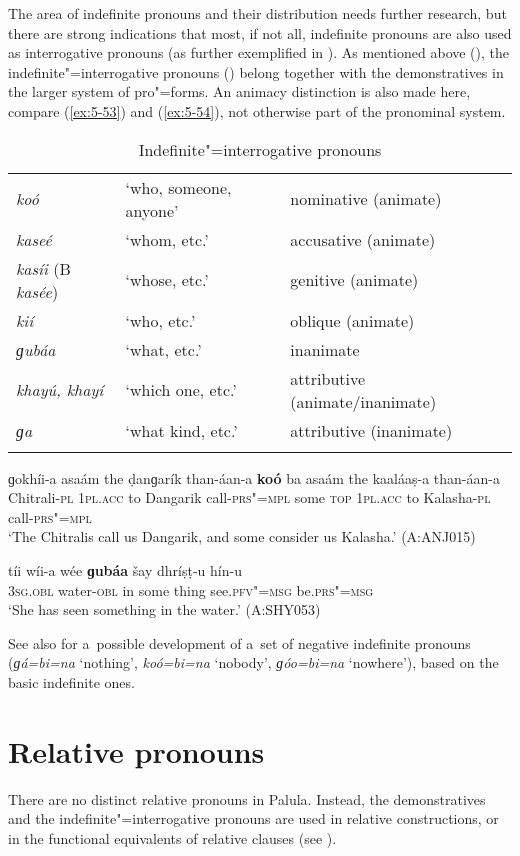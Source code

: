 The area of indefinite pronouns and their distribution needs further research, but there are strong indications that most, if not all, indefinite pronouns are also used as interrogative pronouns (as further exemplified in ). As mentioned above (), the indefinite"=interrogative pronouns () belong together with the demonstratives in the larger system of pro"=forms. An animacy distinction is also made here, compare (\ref{ex:5-53}) and (\ref{ex:5-54}), not otherwise part of the pronominal system.

\begin{table}[H]
\caption{Indefinite"=interrogative pronouns}
\begin{tabularx}{\textwidth}{ l l l }
\lsptoprule
\textit{koó} &
`who, someone, anyone' &
nominative (animate)\\
\textit{kaseé} &
`whom, etc.' &
accusative (animate)\\
\textit{kasíi} (B \textit{kasée}) &
`whose, etc.' &
genitive (animate)\\
\textit{kií} &
`who, etc.' &
oblique (animate)\\
\textit{ɡubáa} &
`what, etc.' &
inanimate \\
\textit{khayú, khayí} &
`which one, etc.' &
attributive (animate/inanimate)\\
\textit{ɡa} &
`what kind, etc.' &
attributive (inanimate)\\\lspbottomrule
\end{tabularx}
\label{tab:5-iipro}
\end{table}


\begin{exe}
\ex
\label{ex:5-53}
\gll ɡokhíi-a asaám the ḍanɡarík than-áan-a \textbf{koó} ba asaám the kaaláaṣ-a than-áan-a\\
Chitrali-\textsc{pl} \textsc{1pl.acc} to Dangarik call-\textsc{prs"=mpl} some \textsc{top} \textsc{1pl.acc} to Kalasha-\textsc{pl} call-\textsc{prs"=mpl}\\
\glt `The Chitralis call us Dangarik, and some consider us Kalasha.' (A:ANJ015)

\ex
\label{ex:5-54}
\gll tíi wíi-a wée \textbf{ɡubáa} šay dhríṣṭ-u hín-u\\
\textsc{3sg.obl} water-\textsc{obl} in some thing see.\textsc{pfv"=msg} be.\textsc{prs"=msg}\\
\glt `She has seen something in the water.' (A:SHY053)
\end{exe}


See also  for a~possible development of a~set of negative indefinite pronouns (\textit{ɡá=bi=na} `nothing', \textit{koó=bi=na} `nobody', \textit{ɡóo=bi=na} `nowhere'), based on the basic indefinite ones.

\section{Relative pronouns}
\label{sec:5-8}


There are no distinct relative pronouns in Palula. Instead, the demonstratives and the indefinite"=interrogative pronouns are used in relative constructions, or in the functional equivalents of relative clauses (see ).